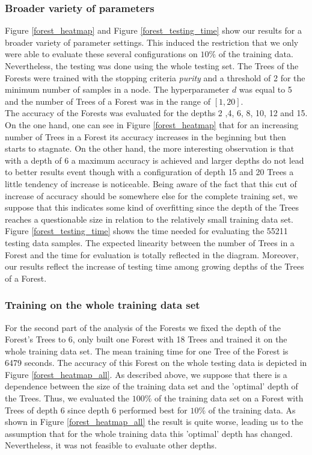 \documentclass[twocolumn]{article}
\begin{document}
\subsubsection{Broader variety of parameters}
Figure \ref{forest_heatmap} and Figure \ref{forest_testing_time} show our results for a broader variety of parameter settings. This induced the restriction that we only were able to evaluate these several configurations on $10\%$ of the training data. Nevertheless, the testing was done using the whole testing set. The Trees of the Forests were trained with the stopping criteria \textit{purity} and a threshold of 2 for the minimum number of samples in a node. The hyperparameter $d$ was equal to 5 and the number of Trees of a Forest was in the range of $[1,20]$.\\
The accuracy of the Forests was evaluated for the depths 2 ,4, 6, 8, 10, 12 and 15. On the one hand, one can see in Figure \ref{forest_heatmap} that for an increasing number of Trees in a Forest its accuracy increases in the beginning but then starts to stagnate. On the other hand, the more interesting observation is that with a depth of 6 a maximum accuracy is achieved and larger depths do not lead to better results event though with a configuration of depth 15 and 20 Trees a little tendency of increase is noticeable. Being aware of the fact that this cut of increase of accuracy should be somewhere else for the complete training set, we suppose that this indicates some kind of overfitting since the depth of the Trees reaches a questionable size in relation to the relatively small training data set.\\
Figure \ref{forest_testing_time} shows the time needed for evaluating the 55211 testing data samples. The expected linearity between the number of Trees in a Forest and the time for evaluation is totally reflected in the diagram. Moreover, our results reflect the increase of testing time among growing depths of the Trees of a Forest.

\subsubsection{Training on the whole training data set}
For the second part of the analysis of the Forests we fixed the depth of the Forest's Trees to 6, only built one Forest with 18 Trees and trained it on the whole training data set. The mean training time for one Tree of the Forest is 6479 seconds. The accuracy of this Forest on the whole testing data is depicted in Figure \ref{forest_heatmap_all}. As described above, we suppose that there is a dependence between the size of the training data set and the 'optimal' depth of the Trees. Thus, we evaluated the $100\%$ of the training data set on a Forest with Trees of depth 6 since depth 6 performed best for $10\%$ of the training data. As shown in Figure \ref{forest_heatmap_all} the result is quite worse, leading us to the assumption that for the whole training data this 'optimal' depth has changed. Nevertheless, it was not feasible to evaluate other depths.
\end{document}
